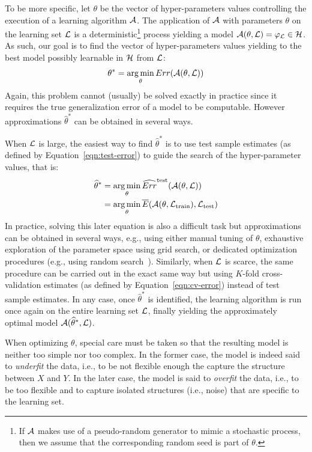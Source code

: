 To be more specific, let $\theta$\label{ntn:theta} be the vector of hyper-parameters values
controlling the execution of a learning algorithm ${\cal A}$. The application
of ${\cal A}$ with parameters $\theta$ on the learning set ${\cal L}$ is a
deterministic\footnote{If ${\cal A}$ makes use of a pseudo-random generator to
mimic a stochastic process, then we assume that the corresponding random seed is
part of $\theta$.} process yielding a model ${\cal A}(\theta, {\cal L}) =
\varphi_{\cal L} \in {\cal H}$\label{ntn:A-func}. As such, our goal is to find the vector of hyper-parameters values
yielding to the best model possibly learnable in ${\cal H}$ from ${\cal L}$:
\begin{equation}
\theta^* = \operatorname*{arg\,min}_{\theta} Err({\cal A}(\theta, {\cal L}))
\end{equation}\label{ntn:theta-star}
Again, this problem cannot (usually) be solved exactly in practice since
it requires the true generalization error of a model to be computable. However
approximations $\widehat{\theta}^*$\label{ntn:theta-star-approx} can be obtained in several ways.

When ${\cal L}$ is large, the easiest way to find $\widehat{\theta}^*$ is to
use test sample estimates (as defined by Equation~\ref{eqn:test-error}) to
guide the search of the hyper-parameter values, that is:
\begin{align}
\widehat{\theta}^* &= \operatorname*{arg\,min}_{\theta} \widehat{Err}^\text{test}({\cal A}(\theta, {\cal L})) \\
                   &= \operatorname*{arg\,min}_{\theta} \overline{E}({\cal A}(\theta, {\cal L}_\text{train}), {\cal L}_\text{test})
\end{align}
In practice, solving this later equation is also a difficult task but
approximations can be obtained in several ways, e.g., using either manual
tuning of $\theta$, exhaustive exploration of the parameter space using grid
search, or dedicated optimization procedures (e.g., using random
search~\citep{bergstra:2012}). Similarly, when ${\cal L}$ is scarce, the same
procedure can be carried out in the exact same way but using $K$-fold
cross-validation estimates (as defined by Equation~\ref{eqn:cv-error}) instead of test sample
estimates. In any case, once $\widehat{\theta}^*$ is identified, the learning
algorithm is run once again on the entire learning set ${\cal L}$, finally
yielding the approximately optimal model ${\cal A}(\widehat{\theta}^*, {\cal
L})$.

When optimizing $\theta$, special care must be taken so that the resulting model
is neither too simple nor too complex. In the former case, the model is indeed
said to \textit{underfit} the data, i.e., to be not flexible enough the capture
the structure between $X$ and $Y$. In the later case, the model is said to
\textit{overfit} the data, i.e., to be too flexible and to capture isolated
structures (i.e., noise) that are specific to the learning set.

